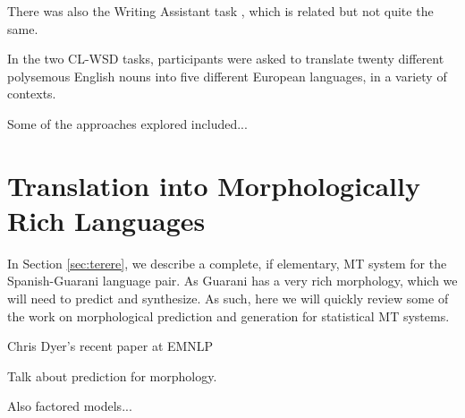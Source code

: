 There was also the Writing Assistant task \cite{vangompel-EtAl:2014:SemEval},
which is related but not quite the same.

In the two CL-WSD tasks, participants were asked to translate twenty different
polysemous English nouns into five different European languages, in a variety
of contexts.

Some of the approaches explored included...

\section{Translation into Morphologically Rich Languages}
In Section \ref{sec:terere}, we describe a complete, if elementary, MT system
for the Spanish-Guarani language pair. As Guarani has a very rich morphology,
which we will need to predict and synthesize. As such, here we will quickly
review some of the work on morphological prediction and generation for
statistical MT systems.

Chris Dyer's recent paper at EMNLP
\cite{chahuneau:2013:emnlp}

Talk about prediction for morphology.
\cite{toutanova-suzuki-ruopp:2008:ACLMain}

Also factored models...
\cite{yeniterzi-oflazer:2010:ACL}
